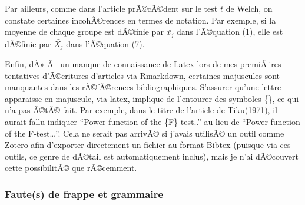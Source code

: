 \begin{appendix}
Par ailleurs, comme dans l'article prÃ©cÃ©dent sur le test \(t\) de
Welch, on constate certaines incohÃ©rences en termes de notation. Par
exemple, si la moyenne de chaque groupe est dÃ©finie par \(\bar{x_j}\)
dans l'Ã©quation (1), elle est dÃ©finie par \(\bar{X_j}\) dans
l'Ã©quation (7).

Enfin, dÃ» Ã~ un manque de connaissance de Latex lors de mes premiÃ¨res
tentatives d'Ã©critures d'articles via Rmarkdown, certaines majuscules
sont manquantes dans les rÃ©fÃ©rences bibliographiques. S'assurer qu'une
lettre apparaisse en majuscule, via latex, implique de l'entourer des
symboles \{\}, ce qui n'a pas Ã©tÃ© fait. Par exemple, dans le titre de
l'article de Tiku(1971), il aurait fallu indiquer ``Power function of
the \{F\}-test..'' au lieu de ``Power function of the F-test\ldots{}''.
Cela ne serait pas arrivÃ© si j'avais utilisÃ© un outil comme Zotero
afin d'exporter directement un fichier au format Bibtex (puisque via ces
outils, ce genre de dÃ©tail est automatiquement inclus), mais je n'ai
dÃ©couvert cette possibilitÃ© que rÃ©cemment.

\hypertarget{fautes-de-frappe-et-grammaire}{%
\subsubsection{Faute(s) de frappe et
grammaire}\label{fautes-de-frappe-et-grammaire}}


\end{appendix}
